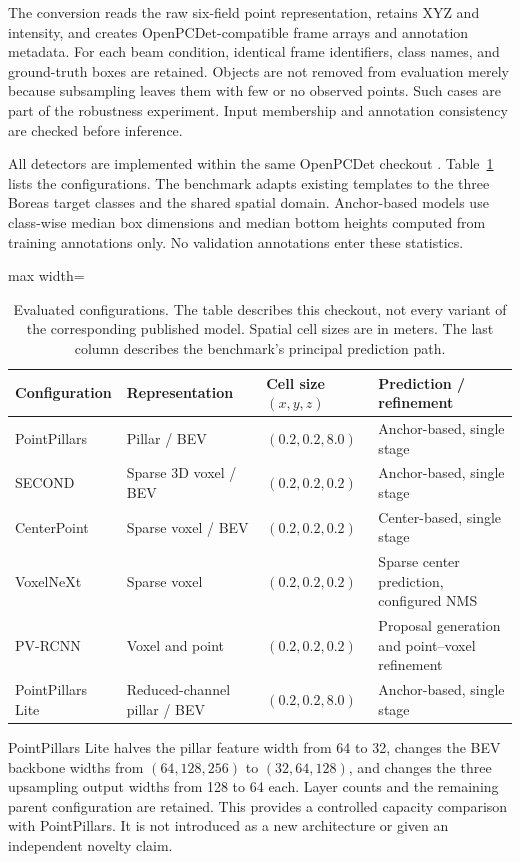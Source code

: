 \documentclass[10pt,twocolumn]{article}
\begin{document}
The conversion reads the raw six-field point representation, retains XYZ and intensity, and creates OpenPCDet-compatible frame arrays and annotation metadata. For each beam condition, identical frame identifiers, class names, and ground-truth boxes are retained. Objects are not removed from evaluation merely because subsampling leaves them with few or no observed points. Such cases are part of the robustness experiment. Input membership and annotation consistency are checked before inference.


All detectors are implemented within the same OpenPCDet checkout \cite{openpcdet2020}. Table~\ref{tab:models} lists the configurations. The benchmark adapts existing templates to the three Boreas target classes and the shared spatial domain. Anchor-based models use class-wise median box dimensions and median bottom heights computed from training annotations only. No validation annotations enter these statistics.

\begin{table}[!tbp]
\centering\small
\caption{Evaluated configurations. The table describes this checkout, not every variant of the corresponding published model. Spatial cell sizes are in meters. The last column describes the benchmark's principal prediction path.}
\label{tab:models}
\begin{adjustbox}{max width=\textwidth}\begin{tabular}{llll}
\toprule
Configuration & Representation & Cell size $(x,y,z)$ & Prediction / refinement\\
\midrule
PointPillars & Pillar / BEV & $(0.2,0.2,8.0)$ & Anchor-based, single stage\\
SECOND & Sparse 3D voxel / BEV & $(0.2,0.2,0.2)$ & Anchor-based, single stage\\
CenterPoint & Sparse voxel / BEV & $(0.2,0.2,0.2)$ & Center-based, single stage\\
VoxelNeXt & Sparse voxel & $(0.2,0.2,0.2)$ & Sparse center prediction, configured NMS\\
PV-RCNN & Voxel and point & $(0.2,0.2,0.2)$ & Proposal generation and point--voxel refinement\\
PointPillars Lite & Reduced-channel pillar / BEV & $(0.2,0.2,8.0)$ & Anchor-based, single stage\\
\bottomrule
\end{tabular}\end{adjustbox}
\end{table}

PointPillars Lite halves the pillar feature width from 64 to 32, changes the BEV backbone widths from $(64,128,256)$ to $(32,64,128)$, and changes the three upsampling output widths from 128 to 64 each. Layer counts and the remaining parent configuration are retained. This provides a controlled capacity comparison with PointPillars. It is not introduced as a new architecture or given an independent novelty claim.
\end{document}

